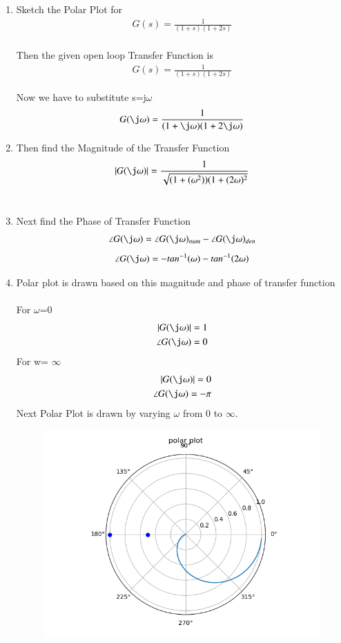 \begin{enumerate}[label=\thesection.\arabic*.,ref=\thesection.\theenumi]
\item
Sketch the Polar Plot for
\begin{align}
G(s) = \frac{1}{(1+s)(1+2s)}
\end{align}
\\
\solution  Then the given open loop Transfer Function is
\begin{align}
G(s) = \frac{1}{(1+s)(1+2s)}
\end{align}

Now we have to substitute s=j$\omega$\\
\begin{align}
G(\j\omega) = \frac{1}{(1+\j\omega)(1+2\j\omega)} 
\end{align}
\item
Then find the Magnitude of the Transfer Function
\\
\solution
\begin{multline}
      |G(\j\omega)| = \frac{1}{\sqrt{(1+(\omega^2))(1+(2\omega)^2}}
\end{multline}\\
\item
Next find the Phase of Transfer Function\\
\solution
\begin{align}
    \angle G(\j\omega) = \angle G(\j\omega)_{num} - \angle G(\j\omega)_{den}
\end{align}
\begin{multline}
    \angle G(\j\omega) = -tan^{-1}(\omega)-tan^{-1}(2\omega)
\end{multline}
\item
Polar plot is drawn based on this magnitude and phase of transfer function\\
\solution\\
For $\omega$=0 
\begin{align}
    |G(\j\omega)| = 1\\
    \angle G(\j\omega) = 0
\end{align}
For w= $\infty$
\begin{align}
    |G(\j\omega)| = 0\\
    \angle G(\j\omega) = -\pi
\end{align}
Next Polar Plot is drawn by varying $\omega$ from 0 to $\infty$.\\
\begin{figure}
    \centering
    \includegraphics[width=0.7\linewidth]{ee18btech11012_1.png}

\end{figure}
\end{enumerate}
